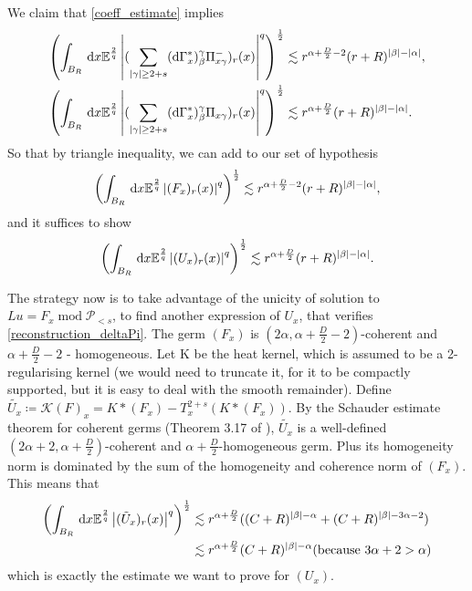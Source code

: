 We claim that \eqref{coeff_estimate} implies 
\begin{align}
    \left(\int_{B_R} \,\mathrm{d} x \mathbb{E}^{\frac{2}{q}}\left| (\sum_{\left| \gamma \right|\geq 2+s} (\mathrm{d}\Gamma^*_x)_\beta^\gamma \Pi_{x\gamma}^-)_r(x) \right|^q \right)^\frac{1}{2} &\lesssim r^{\alpha + \frac{D}{2}-2}(r+R)^{\left| \beta \right| - \left| \alpha \right|},\label{remainder_right}\\
    \left(\int_{B_R} \,\mathrm{d} x \mathbb{E}^{\frac{2}{q}}\left| (\sum_{\left| \gamma \right|\geq 2+s} (\mathrm{d}\Gamma^*_x)_\beta^\gamma \Pi_{x\gamma})_r(x) \right|^q \right)^\frac{1}{2} &\lesssim r^{\alpha + \frac{D}{2}}(r+R)^{\left| \beta \right| - \left| \alpha \right|}. \label{remainder_left}
\end{align}
So that by triangle inequality, we can add to our set of hypothesis
\begin{equation*}
        \left(\int_{B_R} \,\mathrm{d} x \mathbb{E}^{\frac{2}{q}}\left| (F_x)_r(x) \right|^q \right)^\frac{1}{2} \lesssim r^{\alpha + \frac{D}{2}-2}(r+R)^{\left| \beta \right| - \left| \alpha \right|},
\end{equation*}
and it suffices to show
\begin{equation*}
        \left(\int_{B_R} \,\mathrm{d} x \mathbb{E}^{\frac{2}{q}}\left| (U_x)_r(x) \right|^q \right)^\frac{1}{2} \lesssim r^{\alpha + \frac{D}{2}}(r+R)^{\left| \beta \right| - \left| \alpha \right|}.
\end{equation*}


The strategy now is to take advantage of the unicity of solution to $Lu = F_x \operatorname*{mod} \mathcal{P}_{<s}$, to find another expression of $U_x$, that verifies \eqref{reconstruction_deltaPi}.
The germ $(F_x)$ is $(2\alpha, \alpha + \frac{D}{2} - 2)$-coherent and $\alpha + \frac{D}{2} - 2$ - homogeneous.
Let K be the heat kernel, which is assumed to be a 2-regularising kernel (we would need to truncate it, for it to be compactly supported, but it is easy to deal with the smooth remainder).
Define $\tilde{U_x}\coloneq \mathcal{K}(F)_x = K*(F_x) - T_x^{2+s}(K*(F_x))$.
By the Schauder estimate theorem for coherent germs (Theorem 3.17 of \cite{BCZ24}), $\tilde{U_x}$ is a well-defined $(2\alpha + 2, \alpha +\frac{D}{2})$-coherent and $\alpha + \frac{D}{2}$-homogeneous germ.
Plus its homogeneity norm is dominated by the sum of the homogeneity and coherence norm of $(F_x)$.
This means that 
\begin{align}
        \left(\int_{B_R} \,\mathrm{d} x \mathbb{E}^{\frac{2}{q}}\left| (\tilde{U}_x)_r(x) \right|^q \right)^\frac{1}{2} &\lesssim r^{\alpha + \frac{D}{2}}((C+R)^{\left| \beta \right| - \alpha}+(C+R)^{\left| \beta \right| - 3\alpha-2})\\
&\lesssim r^{\alpha + \frac{D}{2}}(C+R)^{\left| \beta \right| - \alpha} (\text{because }3\alpha+2>\alpha)
\end{align}
which is exactly the estimate we want to prove for $(U_x)$.

